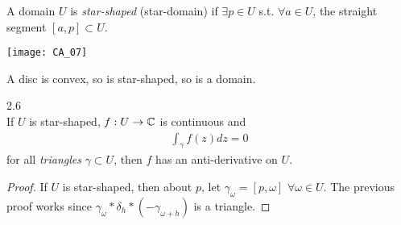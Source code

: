 \documentclass[a4paper]{article}
\begin{document}
\begin{defi}
A domain $U$ is \emph{star-shaped} (star-domain) if $\exists p \in U$ s.t. $\forall a \in U$, the straight segment $[a,p] \subset U$.

\texttt{[image: CA\_07]}
\end{defi}

\begin{eg}
A disc is convex, so is star-shaped, so is a domain.
\end{eg}

\begin{coro} 2.6\\
If $U$ is star-shaped, $f: U \to \mathbb{C}$ is continuous and
\begin{equation*}
\begin{aligned}
\int_\gamma f(z) dz = 0
\end{aligned}
\end{equation*}
for all \emph{triangles} $\gamma \subset U$, then $f$ has an anti-derivative on $U$.
\begin{proof}
If $U$ is star-shaped, then about $p$, let $\gamma_\omega = [p,\omega]$ $\forall \omega \in U$. The previous proof works since $\gamma_\omega * \delta_h * (-\gamma_{\omega+h})$ is a triangle.
\end{proof}
\end{coro}
\end{document}
